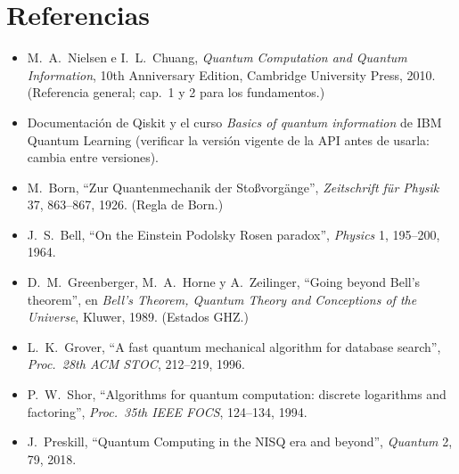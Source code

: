 \ifdefined\enmain\else
  \def\tituloconcepto{Referencias}
  
\fi
\section*{Referencias}
\begin{itemize}
  \item M.~A.~Nielsen e I.~L.~Chuang, \emph{Quantum Computation and Quantum
    Information}, 10th Anniversary Edition, Cambridge University Press, 2010.
    (Referencia general; cap.~1 y 2 para los fundamentos.)
  \item Documentación de Qiskit y el curso \emph{Basics of quantum information}
    de IBM Quantum Learning (verificar la versión vigente de la API antes de
    usarla: cambia entre versiones).
  \item M.~Born, ``Zur Quantenmechanik der Stoßvorgänge'', \emph{Zeitschrift
    für Physik} 37, 863--867, 1926. (Regla de Born.)
  \item J.~S.~Bell, ``On the Einstein Podolsky Rosen paradox'',
    \emph{Physics} 1, 195--200, 1964.
  \item D.~M.~Greenberger, M.~A.~Horne y A.~Zeilinger, ``Going beyond Bell's
    theorem'', en \emph{Bell's Theorem, Quantum Theory and Conceptions of the
    Universe}, Kluwer, 1989. (Estados GHZ.)
  \item L.~K.~Grover, ``A fast quantum mechanical algorithm for database
    search'', \emph{Proc.\ 28th ACM STOC}, 212--219, 1996.
  \item P.~W.~Shor, ``Algorithms for quantum computation: discrete logarithms
    and factoring'', \emph{Proc.\ 35th IEEE FOCS}, 124--134, 1994.
  \item J.~Preskill, ``Quantum Computing in the NISQ era and beyond'',
    \emph{Quantum} 2, 79, 2018.
\end{itemize}
\ifdefined\enmain\else\fi
